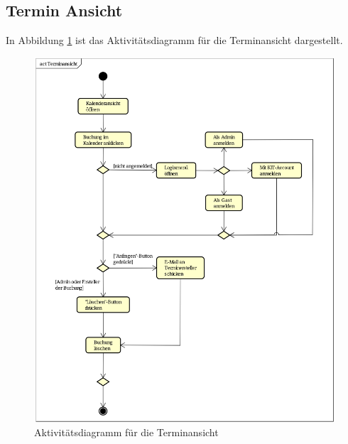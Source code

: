 \subsection{Termin Ansicht}
In Abbildung \ref{fig:activity_diagram_calendar} ist das Aktivitätsdiagramm für die Terminansicht dargestellt.
\begin{figure}[ht]
    \centering
    \includegraphics[scale=0.15]{figures/activitydiagrams/terminansicht}
    \caption{Aktivitätsdiagramm für die Terminansicht}
    \label{fig:activity_diagram_calendar}
\end{figure}